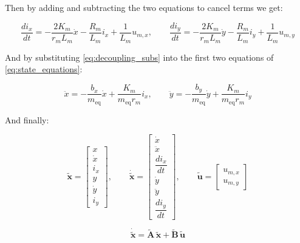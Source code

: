 Then by adding and subtracting the two equations to cancel terms we get:

\begin{equation}
\label{eq:decoupled_currents}
\frac{di_x}{dt} = -\frac{2K_m}{r_m L_m}\dot x - \frac{R_m}{L_m} i_x + \frac{1}{L_m} u_{m,x}, \qquad
\frac{di_y}{dt} = -\frac{2K_m}{r_m L_m}\dot y - \frac{R_m}{L_m} i_y + \frac{1}{L_m} u_{m,y}
\end{equation}

And by substituting \eqref{eq:decoupling_subs} into the first two equations of \eqref{eq:state_equations}:

\begin{equation}
\label{eq:decoupled_motion}
\ddot x = -\frac{b_x}{m_{\mathrm{eq}}}\dot x + \frac{K_m}{m_{\mathrm{eq}} r_m} i_x, \qquad
\ddot y = -\frac{b_y}{m_{\mathrm{eq}}}\dot y + \frac{K_m}{m_{\mathrm{eq}} r_m} i_y
\end{equation}

And finally:

\begin{equation*}
\tilde{\mathbf{x}} = \begin{bmatrix} x \\ \dot x \\ i_x \\ y \\ \dot y \\ i_y \end{bmatrix},
\qquad
\dot{\tilde{\mathbf{x}}} = \begin{bmatrix} \dot x \\ \ddot x \\ \dfrac{di_x}{dt} \\[1ex] \dot y \\ \ddot y \\ \dfrac{di_y}{dt} \end{bmatrix},
\qquad
\tilde{\mathbf{u}} = \begin{bmatrix} u_{m,x} \\ u_{m,y} \end{bmatrix}
\end{equation*}

\begin{equation}
\label{eq:state_space_decoupled}
\dot{\tilde{\mathbf{x}}} = \tilde{\mathbf{A}}\,\tilde{\mathbf{x}} + \tilde{\mathbf{B}}\,\tilde{\mathbf{u}}
\end{equation}

